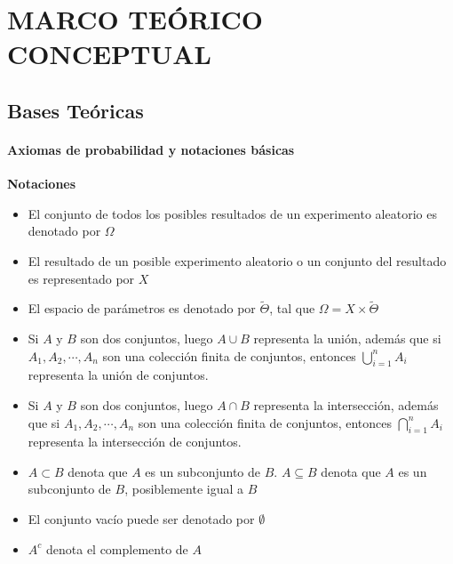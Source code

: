 \newpage
\chapter{MARCO TEÓRICO CONCEPTUAL}

\section{Bases Teóricas}

\subsubsection{Axiomas de probabilidad y notaciones básicas}

\begin{definition}
    \textbf{Notaciones} \citep{koski2011bayesian}
    \begin{itemize}
        \item El conjunto de todos los posibles resultados de un experimento aleatorio es denotado por $\Omega$
        \item El resultado de un posible experimento aleatorio o un conjunto del resultado es representado por $X$
        \item El espacio de parámetros es denotado por $\tilde{\Theta}$, tal que $\Omega = X \times \tilde{\Theta}$
        \item Si $A$ y $B$ son dos conjuntos, luego $A \cup B$ representa la unión, además que si ${A}_{1},{A}_{2},\cdots,{A}_{n}$ son una colección finita de conjuntos, entonces $\bigcup_{i=1}^{n} {A}_{i}$ representa la unión de conjuntos.
        \item Si $A$ y $B$ son dos conjuntos, luego $A \cap B$ representa la intersección, además que si ${A}_{1},{A}_{2},\cdots,{A}_{n}$ son una colección finita de conjuntos, entonces $\bigcap_{i=1}^{n} {A}_{i}$ representa la intersección de conjuntos.
        \item $A \subset B$ denota que $A$ es un subconjunto de $B$. $A \subseteq B$ denota que $A$ es un subconjunto de $B$, posiblemente igual a $B$
        \item El conjunto vacío puede ser denotado por $\emptyset$
        \item ${A}^{c}$ denota el complemento de $A$ 
    \end{itemize}
\end{definition}

